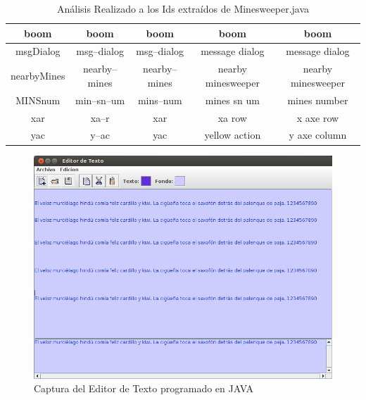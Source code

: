 \begin{table}
\begin{tabular}{| c | c | c | c | c |}
boom&boom&boom&boom&boom\\ \hline
msgDialog&msg--dialog&msg--dialog&message dialog&message dialog\\ \hline
nearbyMines&nearby--mines&nearby--mines&nearby minesweeper&nearby minesweeper\\ \hline
MINSnum&min--sn--um&mins--num&mines sn um&mines number\\ \hline
xar&xa--r&xar&xa row&x axe row\\ \hline
yac&y--ac&yac&yellow action&y axe column\\ \hline

  \end{tabular}
	 
   \caption{Análisis Realizado a los Ids extraídos de Minesweeper.java}
   \label{tabla5}
     
\end{table}

\clearpage %

\begin{figure}[t] %
\centerline{%
\includegraphics[scale= 0.64]{./cap5/caso_02.png}
}
\caption{Captura del Editor de Texto programado en JAVA}
\label{caso2}
\end{figure}

